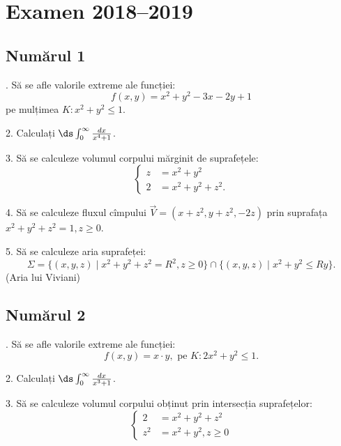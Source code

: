 \chapter{Examen 2018--2019}

\section{Numărul 1}

\indent{}. Să se afle valorile extreme ale funcției:
\[
  f(x,y) = x^2 + y^2 - 3x - 2y + 1
\]
pe mulțimea $K: x^2 + y^2 \leq 1$.

\vspace{0.5cm}

2. Calculați $\ds\int_0^\infty \frac{dx}{x^4 + 1}$.

\vspace{0.5cm}

3. Să se calculeze volumul corpului mărginit de suprafețele:
\[
  \begin{cases}
    z &= x^2 + y^2 \\
    2 &= x^2 + y^2 + z^2.
  \end{cases}
\]

\vspace{0.5cm}

4. Să se calculeze fluxul cîmpului $\vec{V} = (x + z^2, y + z^2, -2z)$
prin suprafața $x^2 + y^2 + z^2 = 1, z \geq 0$.

\vspace{0.5cm}

5. Să se calculeze aria suprafeței:
\[
  \Sigma = \{ (x, y, z) \mid x^2 + y^2 + z^2 = R^2, z \geq 0 \} \cap %
  \{ (x, y, z) \mid x^2 + y^2 \leq Ry \}.
\]
(Aria lui Viviani)


\section{Numărul 2}

\indent{}. Să se afle valorile extreme ale funcției:
\[
  f(x, y) = x \cdot y, \text{ pe } K: 2x^2 + y^2 \leq 1.
\]

\vspace{0.5cm}

2. Calculați $\ds\int_0^\infty \frac{dx}{x^3 + 1}$.

\vspace{0.5cm}

3. Să se calculeze volumul corpului obținut prin intersecția suprafețelor:
\[
  \begin{cases}
    2 &= x^2 + y^2 + z^2 \\
    z^2 &= x^2 + y^2, z \geq 0
  \end{cases}
\]

